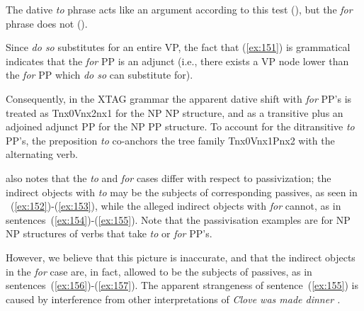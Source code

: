 \beginsentences
{}\label{ex:145} 
\label{ex:146} 
\label{ex:147} 
\endsentences

 
\noindent The dative {\it to} phrase acts like an argument according to this 
test (), but the {\it for} phrase does not (). 
 
\beginsentences
{}\label{ex:148} 
\label{ex:149} 
\endsentences

 
\beginsentences
{}\label{ex:150} 
\label{ex:151} 
\endsentences

 
Since {\it do so} substitutes for an entire VP, the fact that (\ref{ex:151}) is 
grammatical indicates that the {\it for} PP is an adjunct (i.e., there exists a 
VP node lower than the {\it for} PP which {\it do so} can substitute for). 
 
Consequently, in the XTAG grammar the apparent dative shift with {\it for} PP's is treated as Tnx0Vnx2nx1 for the NP NP structure, and as a 
transitive plus an adjoined adjunct PP for the NP PP structure.  To 
account for the ditransitive {\it to} PP's, the preposition {\it to} 
co-anchors the tree family Tnx0Vnx1Pnx2 with the alternating 
verb. 
 
\cite{mccawley88} also notes that the {\it to} and {\it for} cases 
differ with respect to passivization; the indirect objects with {\it to} may be 
the subjects of corresponding passives, as seen in ~(\ref{ex:152})-(\ref{ex:153}), while 
the alleged indirect objects with {\it for} cannot, as in 
sentences~(\ref{ex:154})-(\ref{ex:155}).  Note that the passivisation examples are for NP 
NP structures of verbs that take {\it to} or {\it for} PP's. 
 
\beginsentences
{}\label{ex:152} 
\label{ex:153} 
\label{ex:154} 
\label{ex:155} 
\endsentences

 
However, we believe that this picture is inaccurate, and that the indirect 
objects in the {\it for} case are, in fact, allowed to be the subjects of 
passives, as in sentences~(\ref{ex:156})-(\ref{ex:157}).  The apparent strangeness of 
sentence~(\ref{ex:155}) is caused by interference from other interpretations of {\it Clove was made dinner .} 
 
\beginsentences
{}\label{ex:156} 
\label{ex:157} 
\endsentences

 
 
 
 
 
 
